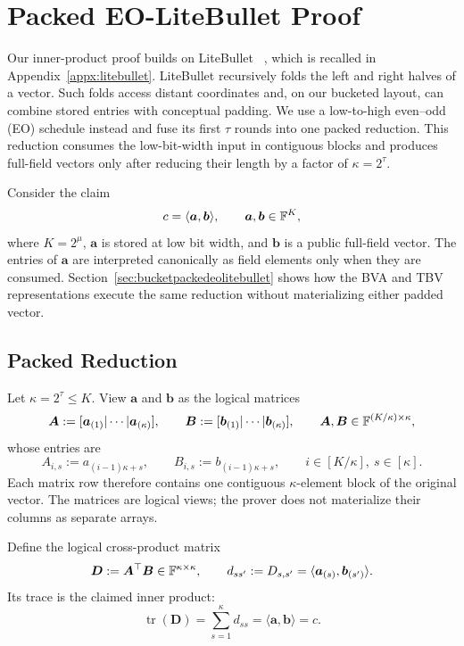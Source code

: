 \section{Packed EO-LiteBullet Proof}
\label{sec:packedeolitebullet}

Our inner-product proof builds on LiteBullet
~\cite[Algorithm~1]{asiacrypt/CongCYY25}, which is recalled in
Appendix~\ref{appx:litebullet}. LiteBullet recursively folds the left and
right halves of a vector. Such folds access distant coordinates and, on our
bucketed layout, can combine stored entries with conceptual padding. We use a
low-to-high even--odd (EO) schedule instead and fuse its first $\tau$ rounds
into one packed reduction. This reduction consumes the low-bit-width input in
contiguous blocks and produces full-field vectors only after reducing their
length by a factor of $\kappa=2^\tau$.

Consider the claim
\[
    c=\langle\bm a,\bm b\rangle,
    \qquad \bm a,\bm b\in{\mathbb{F}}^K,
\]
where $K=2^\mu$, $\bm a$ is stored at low bit width, and $\bm b$ is a public
full-field vector. The entries of $\bm a$ are interpreted canonically as field
elements only when they are consumed. Section~\ref{sec:bucketpackedeolitebullet}
shows how the BVA and TBV representations execute the same reduction without
materializing either padded vector.

\subsection{Packed Reduction}

Let $\kappa=2^\tau\le K$. View $\bm a$ and $\bm b$ as the logical matrices
\[
    \bm A
    :=[\bm a_{(1)}|\cdots|\bm a_{(\kappa)}],
    \qquad
    \bm B
    :=[\bm b_{(1)}|\cdots|\bm b_{(\kappa)}],
    \qquad
    \bm A,\bm B\in{\mathbb{F}}^{(K/\kappa)\times\kappa},
\]
whose entries are
\begin{equation}
\label{eq:packed-matrix-layout}
    A_{i,s}:=a_{(i-1)\kappa+s},
    \qquad
    B_{i,s}:=b_{(i-1)\kappa+s},
    \qquad i\in[K/\kappa],\ s\in[\kappa].
\end{equation}
Each matrix row therefore contains one contiguous $\kappa$-element block of
the original vector. The matrices are logical views; the prover does not
materialize their columns as separate arrays.

Define the logical cross-product matrix
\[
    \bm D:=\bm A^\top\bm B\in{\mathbb{F}}^{\kappa\times\kappa},
    \qquad
    d_{ss'}:=D_{s,s'}
    =\langle\bm a_{(s)},\bm b_{(s')}\rangle.
\]
Its trace is the claimed inner product:
\begin{equation}
\label{eq:packed-trace}
    \operatorname{tr}(\bm D)
    =\sum_{s=1}^{\kappa}d_{ss}
    =\langle\bm a,\bm b\rangle
    =c.
\end{equation}

